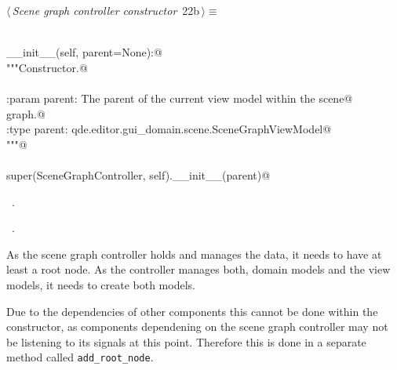 \documentclass[
    a4paper,      %
    10pt,         %
    openright,    %
    notitlepage,  %
    parskip=half, %
]{scrreprt}       %
\theoremstyle{definition}                    %
\begin{document}
\begin{flushleft} \small
\begin{minipage}{\linewidth}\label{scrap17}\raggedright\small
{} $\langle\,${\itshape Scene graph controller constructor}\nobreak\ {\footnotesize {22b}}$\,\rangle\equiv$
\vspace{-1ex}
\begin{list}{}{} \item
\mbox{}\lstinline@@\\
\mbox{}\lstinline@def __init__(self, parent=None):@\\
\mbox{}\lstinline@    """Constructor.@\\
\mbox{}\lstinline@@\\
\mbox{}\lstinline@    :param parent: The parent of the current view model within the scene@\\
\mbox{}\lstinline@                    graph.@\\
\mbox{}\lstinline@    :type parent:  qde.editor.gui_domain.scene.SceneGraphViewModel@\\
\mbox{}\lstinline@    """@\\
\mbox{}\lstinline@@\\
\mbox{}\lstinline@    super(SceneGraphController, self).__init__(parent)@\\
\mbox{}\lstinline@@{\NWsep}
\end{list}
\vspace{-1.5ex}
\footnotesize
\begin{list}{}{\setlength{\itemsep}{-\parsep}\setlength{\itemindent}{-\leftmargin}}
\item \NWtxtMacroDefBy\ .
\item \NWtxtMacroRefIn\ .

\item{}
\end{list}
\end{minipage}\vspace{4ex}
\end{flushleft}
As the scene graph controller holds and manages the data, it needs to have at
least a root node. As the controller manages both, domain models and the view
models, it needs to create both models.

Due to the dependencies of other components this cannot be done within the
constructor, as components dependening on the scene graph controller may not be
listening to its signals at this point. Therefore this is done in a separate
method called \verb+add_root_node+.
\end{document}

